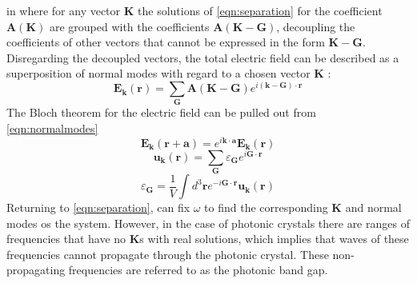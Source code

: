 in where for any vector $\boldsymbol{K}$ the solutions of \eqref{eqn:separation} for the coefficient $\boldsymbol{A}(\boldsymbol{K})$ are grouped with the coefficients $\boldsymbol{A}(\boldsymbol{K}-\boldsymbol{G})$, decoupling the coefficients of other vectors that cannot be expressed in the form $\boldsymbol{K}-\boldsymbol{G}$. Disregarding the decoupled vectors, the total electric field can be described as a superposition of normal modes with regard to a chosen vector $\boldsymbol{K}$ :
\begin{equation}
	\boldsymbol{E}_{\boldsymbol{k}}(\boldsymbol{r}) = \sum_{\boldsymbol{G}}\boldsymbol{A}(\boldsymbol{K}-\boldsymbol{G})e^{i(\boldsymbol{k}-\boldsymbol{G})\cdot \boldsymbol{r}}
	\label{eqn:normalmodes}
\end{equation}
The Bloch theorem for the electric field can be pulled out  from \eqref{eqn:normalmodes}
\begin{equation}
	\boldsymbol{E}_{\boldsymbol{k}}(\boldsymbol{r}+\boldsymbol{a}) = e^{i\boldsymbol{k}\cdot \boldsymbol{a}}\boldsymbol{E}_{\boldsymbol{k}}(\boldsymbol{r})
\end{equation}
\begin{equation}
	\boldsymbol{u_k}(\boldsymbol{r}) = \sum_{\boldsymbol{G}}\varepsilon_{\boldsymbol{G}}e^{i\boldsymbol{G}\cdot\boldsymbol{r}}
\end{equation}
\begin{equation}
	\varepsilon_{\boldsymbol{G}} = \frac{1}{V}\int d^3\boldsymbol{r}e^{-i\boldsymbol{G}\cdot\boldsymbol{r}}\boldsymbol{u_k}(\boldsymbol{r})
	\label{eqn:perm}
\end{equation}
Returning to \eqref{eqn:separation}, can fix $\omega$ to find the corresponding $\boldsymbol{K}$ and normal modes os the system. However, in the case of photonic crystals there are ranges of frequencies that  have no $\boldsymbol{K}$s with real solutions, which implies that waves of these frequencies cannot propagate through the photonic crystal. These non-propagating frequencies are referred to as the photonic band gap.


